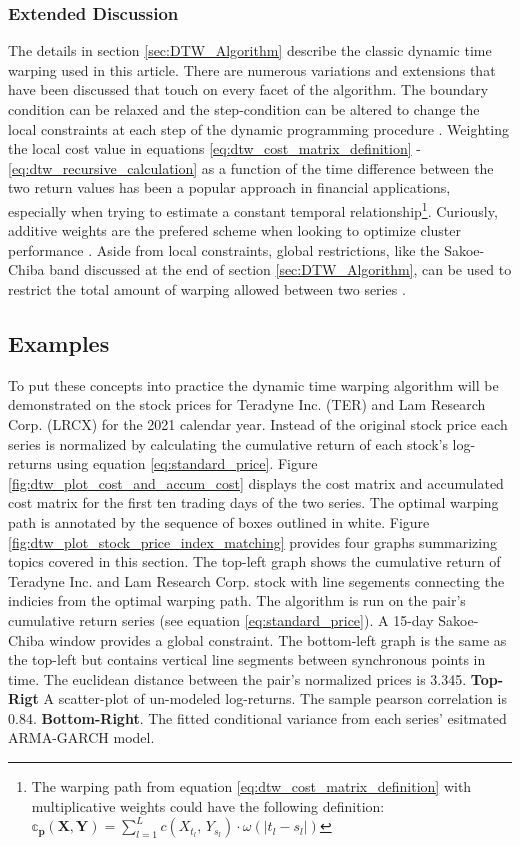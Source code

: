 \documentclass[12pt]{article}
\begin{document}
\subsubsection{Extended Discussion}

The details in section \ref{sec:DTW_Algorithm} describe the classic dynamic time warping used in this article. There are numerous variations and extensions that have been discussed that touch on every facet of the algorithm. The boundary condition can be relaxed and the step-condition can be altered to change the local constraints at each step of the dynamic programming procedure \parencite{SakoeChiba_IEEE_1978}. Weighting the local cost value in equations \ref{eq:dtw_cost_matrix_definition} - \ref{eq:dtw_recursive_calculation} as a function of the time difference between the two return values has been a popular approach in financial applications, especially when trying to estimate a constant temporal relationship\footnote{The warping path from equation \ref{eq:dtw_cost_matrix_definition} with multiplicative weights could have the following definition: $\mathbb{c}_{\boldsymbol{p}}(\boldsymbol{X}, \boldsymbol{Y}) = \sum^{L}_{l=1} c(X_{t_{l}},\, Y_{s_{l}}) \cdot \omega(|t_{l} - s_{l}|)$}. Curiously, additive weights are the prefered scheme when looking to optimize cluster performance \parencite{PETITJEAN2011678, Petitjean_et_al_2016}. Aside from local constraints, global restrictions, like the Sakoe-Chiba band discussed at the end of section \ref{sec:DTW_Algorithm}, can be used to restrict the total amount of warping allowed between two series \parencite{Itakura_1975, SakoeChiba_IEEE_1978, Mueller2007}. 

\subsection{Examples}

To put these concepts into practice the dynamic time warping algorithm will be demonstrated on the stock prices for Teradyne Inc. (TER) and Lam Research Corp. (LRCX) for the 2021 calendar year. Instead of the original stock price each series is normalized by calculating the cumulative return of each stock's log-returns using equation \ref{eq:standard_price}. Figure \ref{fig:dtw_plot_cost_and_accum_cost} displays the cost matrix and accumulated cost matrix for the first ten trading days of the two series. The optimal warping path is annotated by the sequence of boxes outlined in white. Figure \ref{fig:dtw_plot_stock_price_index_matching} provides four graphs summarizing topics covered in this section. The top-left graph shows the cumulative return of Teradyne Inc. and Lam Research Corp. stock with line segements connecting the indicies from the optimal warping path. The algorithm is run on the pair's cumulative return series (see equation \ref{eq:standard_price}). A 15-day Sakoe-Chiba window provides a global constraint. The bottom-left graph is the same as the top-left but contains vertical line segments between synchronous points in time. The euclidean distance between the pair's normalized prices is 3.345. \textbf{Top-Rigt} A scatter-plot of un-modeled log-returns. The sample pearson correlation is 0.84. \textbf{Bottom-Right}. The fitted conditional variance from each series' esitmated ARMA-GARCH model.
\end{document}
